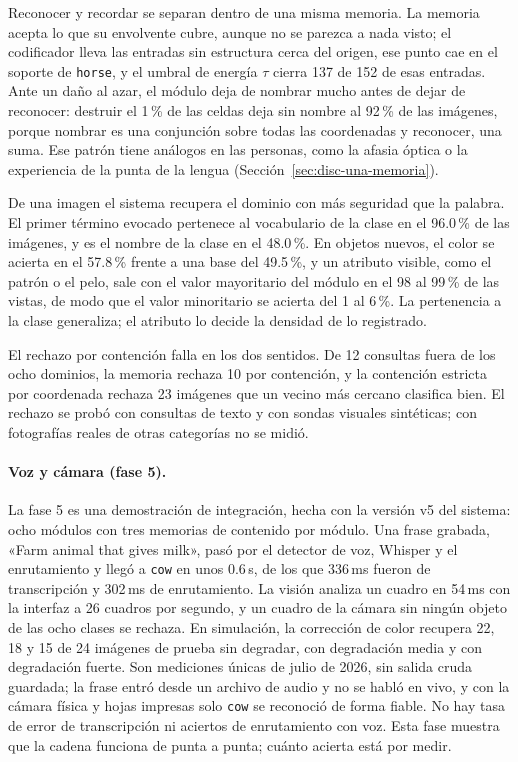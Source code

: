Reconocer y recordar se separan dentro de una misma memoria.
La memoria acepta lo que su envolvente cubre, aunque no se parezca a nada visto; el
codificador lleva las entradas sin estructura cerca del origen, ese punto cae en el
soporte de \texttt{horse}, y el umbral de energía $\tau$ cierra 137 de 152 de esas
entradas.
Ante un daño al azar, el módulo deja de nombrar mucho antes de dejar de reconocer: destruir
el 1\,\% de las celdas deja sin nombre al 92\,\% de las imágenes, porque nombrar es una
conjunción sobre todas las coordenadas y reconocer, una suma.
Ese patrón tiene análogos en las personas, como la afasia óptica o la experiencia de la
punta de la lengua (Sección~\ref{sec:disc-una-memoria}).

De una imagen el sistema recupera el dominio con más seguridad que la palabra.
El primer término evocado pertenece al vocabulario de la clase en el 96.0\,\% de las
imágenes, y es el nombre de la clase en el 48.0\,\%.
En objetos nuevos, el color se acierta en el 57.8\,\% frente a una base del 49.5\,\%, y
un atributo visible, como el patrón o el pelo, sale con el valor mayoritario del módulo
en el 98 al 99\,\% de las vistas, de modo que el valor minoritario se acierta del 1 al
6\,\%.
La pertenencia a la clase generaliza; el atributo lo decide la densidad de lo
registrado.

El rechazo por contención falla en los dos sentidos.
De 12 consultas fuera de los ocho dominios, la memoria rechaza 10 por contención, y la
contención estricta por coordenada rechaza 23 imágenes que un vecino más cercano
clasifica bien.
El rechazo se probó con consultas de texto y con sondas visuales sintéticas; con
fotografías reales de otras categorías no se midió.

\paragraph{Voz y cámara (fase 5).}
La fase 5 es una demostración de integración, hecha con la versión v5 del sistema: ocho
módulos con tres memorias de contenido por módulo.
Una frase grabada, «Farm animal that gives milk», pasó por el detector de voz, Whisper y
el enrutamiento y llegó a \texttt{cow} en unos 0.6\,s, de los que 336\,ms fueron de
transcripción y 302\,ms de enrutamiento.
La visión analiza un cuadro en 54\,ms con la interfaz a 26 cuadros por segundo, y un
cuadro de la cámara sin ningún objeto de las ocho clases se rechaza.
En simulación, la corrección de color recupera 22, 18 y 15 de 24 imágenes de prueba sin
degradar, con degradación media y con degradación fuerte.
Son mediciones únicas de julio de 2026, sin salida cruda guardada; la frase entró desde
un archivo de audio y no se habló en vivo, y con la cámara física y hojas impresas solo
\texttt{cow} se reconoció de forma fiable.
No hay tasa de error de transcripción ni aciertos de enrutamiento con voz.
Esta fase muestra que la cadena funciona de punta a punta; cuánto acierta está por
medir.

